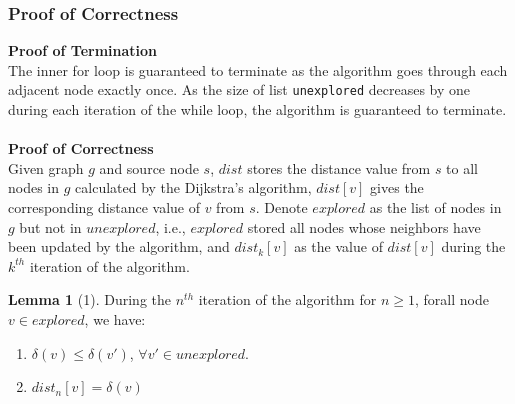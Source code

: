 \documentclass[11pt, a4paper]{article} %
\theoremstyle{definition}
\newtheorem*{lemma}{Lemma}
\begin{document}
\subsubsection{Proof of Correctness}

\textbf{Proof of Termination}
\\
The inner for loop is guaranteed to terminate as the algorithm goes through each adjacent node exactly once. As the size of list \texttt{unexplored} decreases by one during each iteration of the while loop, the algorithm is guaranteed to terminate. 
\\\\
\textbf{Proof of Correctness}
\\
Given graph $g$ and source node $s$, $dist$ stores the distance value from $s$ to all nodes in $g$ calculated by the Dijkstra's algorithm, $dist[v]$ gives the corresponding distance value of $v$ from $s$. Denote $explored$ as the list of nodes in $g$ but not in $unexplored$, i.e., $explored$ stored all nodes whose neighbors have been updated by the algorithm, and $dist_{k}[v]$ as the value of $dist[v]$ during the $k^{th}$ iteration of the algorithm. 
\\
\begin{lemma}
[1] During the $n^{th}$ iteration of the algorithm for $n \geq 1$, forall node $v \in explored$, we have:
\begin{enumerate}
  \item $\delta(v) \leq \delta(v')$, $\forall v' \in unexplored$.
  \item $dist_n[v] = \delta(v)$
\end{enumerate}
\end{lemma}
\end{document}
